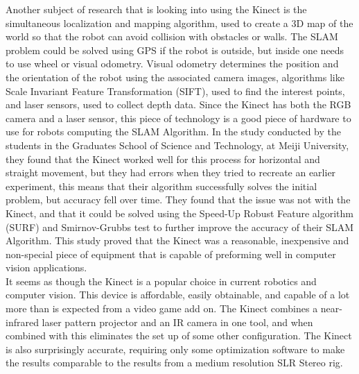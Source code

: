 \documentclass[12pt,twocolumn]{article}
\begin{document}
\begin{description}
\indent	Another subject of research that is looking into using the Kinect is the simultaneous localization and mapping algorithm, used to create a 3D map of the world so that the robot can avoid collision with obstacles or walls. The SLAM problem could be solved using GPS if the robot is outside, but inside one needs to use wheel or visual odometry. Visual odometry determines the position and the orientation of the robot using the associated camera images, algorithms like Scale Invariant Feature Transformation (SIFT), used to find the interest points, and laser sensors, used to collect depth data. Since the Kinect has both the RGB camera and a laser sensor, this piece of technology is a good piece of hardware to use for robots computing the SLAM Algorithm. In the study conducted by the students in the Graduates School of Science and Technology, at Meiji University, they found that the Kinect worked well for this process for horizontal and straight movement, but they had errors when they tried to recreate an earlier experiment, this means that their algorithm successfully solves the initial problem, but accuracy fell over time.  \cite{cite2} They found that the issue was not with the Kinect, and that it could be solved using the Speed-Up Robust Feature algorithm (SURF) and Smirnov-Grubbs test to further improve the accuracy of their SLAM Algorithm. This study proved that the Kinect was a reasonable, inexpensive and non-special piece of equipment that is capable of preforming well in computer vision applications. \\
\indent	It seems as though the Kinect is a popular choice in current robotics and computer vision. This device is affordable, easily obtainable, and capable of a lot more than is expected from a video game add on. The Kinect combines a near-infrared laser pattern projector and an IR camera in one tool, and when combined with this eliminates the set up of some other configuration. The Kinect is also surprisingly accurate, requiring only some optimization software to make the results comparable to the results from a medium resolution SLR Stereo rig.


\end{description}
\end{document}
